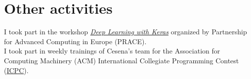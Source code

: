 \documentclass[curriculum-vitae-eng]{subfiles}
\begin{document}
	\section*{Other activities}
		 I took part in the workshop \href{https://prace-indico.niif.hu/event/1336/overview}{\textit{Deep Learning with Keras}} organized by Partnership for Advanced Computing in Europe (PRACE).\\
	
		 I took part in weekly trainings of Cesena's team for the Association for Computing Machinery (ACM) International Collegiate Programming Contest (\href{https://icpc.global}{ICPC}).
	
\end{document}
